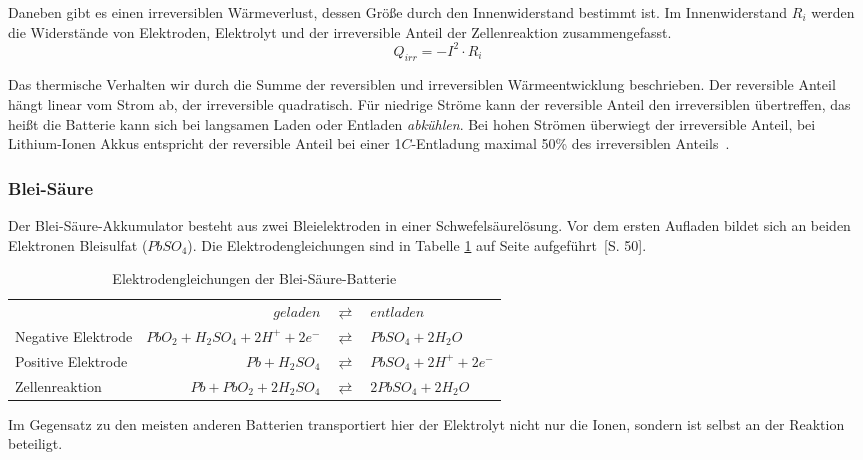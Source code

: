 Daneben gibt es einen irreversiblen Wärmeverlust, dessen Größe durch den Innenwiderstand bestimmt ist. Im Innenwiderstand $R_i$ werden die Widerstände von Elektroden, Elektrolyt und der irreversible Anteil der Zellenreaktion zusammengefasst.
\begin{equation}\label{gl_innenwiderstand}
Q_{irr}=-I^2\cdot R_i
\end{equation}

Das thermische Verhalten wir durch die Summe der reversiblen und irreversiblen Wärmeentwicklung beschrieben. Der reversible Anteil hängt linear vom Strom ab, der irreversible quadratisch. Für niedrige Ströme kann der reversible Anteil den irreversiblen übertreffen, das heißt die Batterie kann sich bei langsamen Laden oder Entladen \emph{abkühlen}. Bei hohen Strömen überwiegt der irreversible Anteil, bei Lithium-Ionen Akkus entspricht der reversible Anteil bei einer 1$C$-Entladung maximal 50\% des irreversiblen Anteils~\cite{Viswanathan20103720}.


\subsubsection{Blei-Säure}
Der Blei-Säure-Akkumulator besteht aus zwei Bleielektroden in einer Schwefelsäurelösung. Vor dem ersten Aufladen bildet sich an beiden Elektronen Bleisulfat ($PbSO_4$). Die Elektrodengleichungen sind in Tabelle \ref{Pb} auf Seite \pageref{Pb} aufgeführt~\cite{KiehneBattery}[S. 50].

\begin{table}\centering
	\begin{tabularx}{\linewidth}{XrcX}
		\toprule
		&                       $geladen$ & $\rightleftarrows$ & $entladen$             \\
		Negative Elektrode & $PbO_2 + H_2SO_4 + 2H^+ + 2e^-$ & $\rightleftarrows$ & $PbSO_4 + 2H_2O$       \\
		Positive Elektrode &                $Pb + H_2SO_4$ & $\rightleftarrows$ & $PbSO_4 + 2H^+ + 2e^-$ \\ \midrule
		Zellenreaktion     &         $Pb + PbO_2 + 2H_2SO_4$ & $\rightleftarrows$ & $2PbSO_4 + 2H_2O$      \\ \bottomrule
	\end{tabularx}
	\caption{Elektrodengleichungen der Blei-Säure-Batterie}
	\label{Pb}
\end{table}

Im Gegensatz zu den meisten anderen Batterien transportiert hier der Elektrolyt nicht nur die Ionen, sondern ist selbst an der Reaktion beteiligt.

